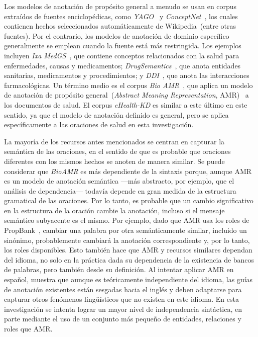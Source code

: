 Los modelos de anotación de propósito general a menudo se usan en corpus extraídos de fuentes enciclopédicas, como \textit{YAGO}~\cite{suchanek2007yago} y \textit{ConceptNet}~\cite{speer2017conceptnet}, los cuales contienen hechos seleccionados automáticamente de Wikipedia~(entre otras fuentes). Por el contrario, los modelos de anotación de dominio específico generalmente se emplean cuando la fuente está más restringida. Los ejemplos incluyen \textit{Ixa MedGS}~\cite{ORONOZ2015318}, que contiene conceptos relacionados con la salud para enfermedades, causas y medicamentos; \textit{DrugSemantics}~\cite{moreno2017drugsemantics}, que anota entidades sanitarias, medicamentos y procedimientos; y \textit{DDI}~\cite{herrero2013ddi}, que anota las interacciones farmacológicas. Un término medio es el corpus \textit{Bio AMR}~\cite{bioamr}, que aplica un modelo de anotación de propósito general~(\textit{Abstract Meaning Representation}, AMR)~\cite{banarescu2013abstract} a los documentos de salud. El corpus \textit{eHealth-KD} es similar a este último en este sentido, ya que el modelo de anotación definido es general, pero se aplica específicamente a las oraciones de salud en esta investigación.

La mayoría de los recursos antes mencionados se centran en capturar la semántica de las oraciones, en el sentido de que es probable que oraciones diferentes con los mismos hechos se anoten de manera similar. Se puede considerar que \textit{BioAMR} es más dependiente de la sintaxis porque, aunque AMR es un modelo de anotación semántica ---más abstracto, por ejemplo, que el análisis de dependencia--- todavía depende en gran medida de la estructura gramatical de las oraciones. Por lo tanto, es probable que un cambio significativo en la estructura de la oración cambie la anotación, incluso si el mensaje semántico subyacente es el mismo. Por ejemplo, dado que AMR usa los roles de PropBank~\cite{propbank}, cambiar una palabra por otra semánticamente similar, incluido un sinónimo, probablemente cambiará la anotación correspondiente y, por lo tanto, los roles disponibles.
Esto también hace que AMR y recursos similares dependan del idioma, no solo en la práctica dada su dependencia de la existencia de bancos de palabras, pero también desde su definición. Al intentar aplicar AMR en español, \citet{migueles2018annotating} muestra que aunque es teóricamente independiente del idioma, las guías de anotación existentes están sesgadas hacia el inglés y deben adaptarse para capturar otros fenómenos lingüísticos que no existen en este idioma.
En esta investigación se intenta lograr un mayor nivel de independencia sintáctica, en parte mediante el uso de un conjunto más pequeño de entidades, relaciones y roles que AMR.

